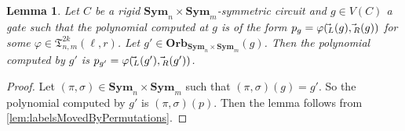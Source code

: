 \documentclass[10pt,a4paper]{article}
\theoremstyle{definition}
\theoremstyle{plain}
\newtheorem{lemma}[definition]{Lemma}
\theoremstyle{remark}
\renewcommand{\phi}{\varphi}
\newcommand{\Sym}{\mathbf{Sym}}
\newcommand{\Orb}{\mathbf{Orb}}
\let\sup\relax
\DeclareMathOperator{\sup}{sup}
\begin{document}
 	\begin{lemma}
 		\label{lem:supportOfGateDeterminesLabels}
 		Let $C$ be a rigid $\Sym_n \times \Sym_m$-symmetric circuit and $g \in V(C)$ a gate such that the polynomial computed at $g$ is of the form $p_g = \phi(\vec{\sup}_L(g),\vec{\sup}_R(g))$ for some $\phi \in \mathfrak{T}^{2k}_{n,m}(\ell, r)$.
 		Let $g' \in \Orb_{\Sym_{n} \times \Sym_{m}}(g)$. Then the polynomial computed by $g'$ is $p_{g'} = \phi(\vec{\sup}_L(g'),\vec{\sup}_R(g'))$.
 	\end{lemma}	
 	\begin{proof}
 		Let $(\pi, \sigma) \in \Sym_{n} \times \Sym_{m}$ such that $(\pi, \sigma)(g)  = g'$. So the polynomial computed by $g'$ is $(\pi, \sigma)(p)$. 
 		Then the lemma follows from \cref{lem:labelsMovedByPermutations}.
 	\end{proof}	
 	
 	
 	 	
\end{document}
